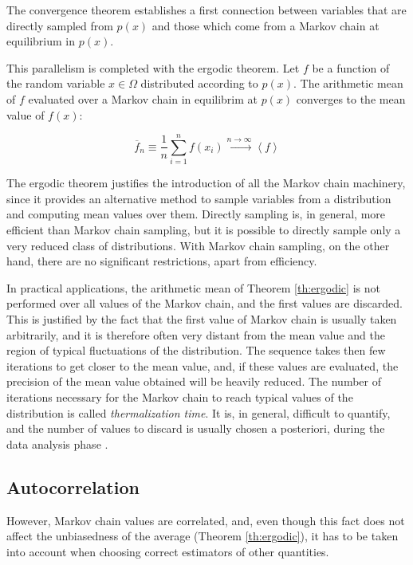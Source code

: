 The convergence theorem establishes a first connection between variables that are directly sampled from $p(x)$
and those which come from a Markov chain at equilibrium in $p(x)$.

This parallelism is completed with the ergodic theorem.
Let $f$ be a function of the random variable $x\in\Omega$ distributed according to $p(x)$.
The arithmetic mean of $f$ evaluated over a Markov chain in equilibrim at $p(x)$ converges to the mean value of $f(x)$:
\begin{theorem}\label{th:ergodic}
    \[
        \overline f_n \equiv \frac{1}{n}\sum_{i=1}^n f(x_i) \xrightarrow{n\to\infty} \left<f\right>
    \]
\end{theorem}

The ergodic theorem justifies the introduction of all the Markov chain machinery,
since it provides an alternative method to sample variables from a distribution and computing mean values over them.
Directly sampling is, in general, more efficient than Markov chain sampling,
but it is possible to directly sample only a very reduced class of distributions.
With Markov chain sampling, on the other hand, there are no significant restrictions, apart from efficiency.

In practical applications, the arithmetic mean of Theorem \ref{th:ergodic} is not performed over all values of the Markov chain,
and the first values are discarded.
This is justified by the fact that the first value of Markov chain is usually taken arbitrarily,
and it is therefore often very distant from the mean value and the region of typical fluctuations of the distribution.
The sequence takes then few iterations to get closer to the mean value, and, if these values are evaluated,
the precision of the mean value obtained will be heavily reduced.
The number of iterations necessary for the Markov chain to reach typical values of the distribution is called \emph{thermalization time}.
It is, in general, difficult to quantify, and the number of values to discard is usually chosen a posteriori, during the data analysis phase \cite{numerical_recipes}.


\subsection*{Autocorrelation}
However, Markov chain values are correlated,
and, even though this fact does not affect the unbiasedness of the average (Theorem \ref{th:ergodic}),
it has to be taken into account when choosing correct estimators of other quantities.%

